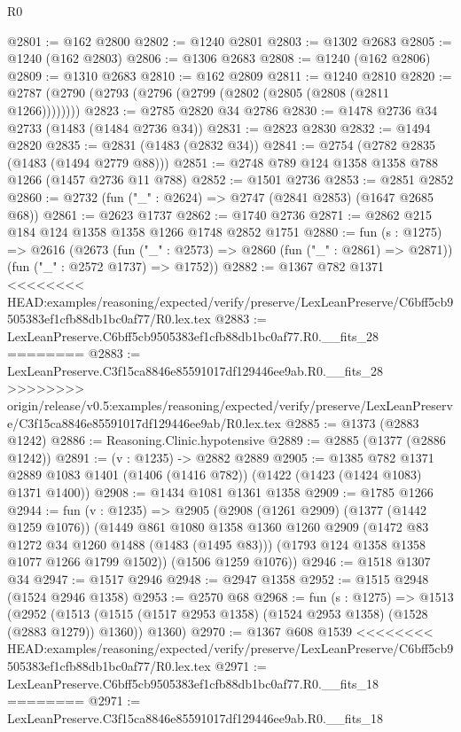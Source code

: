 \begin{lexlean}{R0}
\begin{coremodule}
{{{{{{{{{{{{{{{{{{{{{{{{{{{{{{{{{{{{{{{{{{{{{{{{{{{{{{{{{{{{{{{{{{{{{{{{{{{{{{{{{{{{{{@2801 := @162 @2800
@2802 := @1240 @2801
@2803 := @1302 @2683
@2805 := @1240 (@162 @2803)
@2806 := @1306 @2683
@2808 := @1240 (@162 @2806)
@2809 := @1310 @2683
@2810 := @162 @2809
@2811 := @1240 @2810
@2820 := @2787 (@2790 (@2793 (@2796 (@2799 (@2802 (@2805 (@2808 (@2811 @1266))))))))
@2823 := @2785 @2820 @34 @2786
@2830 := @1478 @2736 @34 @2733 (@1483 (@1484 @2736 @34))
@2831 := @2823 @2830
@2832 := @1494 @2820
@2835 := @2831 (@1483 (@2832 @34))
@2841 := @2754 (@2782 @2835 (@1483 (@1494 @2779 @88)))
@2851 := @2748 @789 @124 @1358 @1358 @788 @1266 (@1457 @2736 @11 @788)
@2852 := @1501 @2736
@2853 := @2851 @2852
@2860 := @2732 (fun ("_" : @2624) => @2747 (@2841 @2853) (@1647 @2685 @68))
@2861 := @2623 @1737
@2862 := @1740 @2736
@2871 := @2862 @215 @184 @124 @1358 @1358 @1266 @1748 @2852 @1751
@2880 := fun (s : @1275) =>
  @2616
    (@2673
      (fun ("_" : @2573) => @2860 (fun ("_" : @2861) => @2871))
      (fun ("_" : @2572 @1737) => @1752))
@2882 := @1367 @782 @1371
<<<<<<<< HEAD:examples/reasoning/expected/verify/preserve/LexLeanPreserve/C6bff5cb9505383ef1cfb88db1bc0af77/R0.lex.tex
@2883 := LexLeanPreserve.C6bff5cb9505383ef1cfb88db1bc0af77.R0.__fits_28
========
@2883 := LexLeanPreserve.C3f15ca8846e85591017df129446ee9ab.R0.__fits_28
>>>>>>>> origin/release/v0.5:examples/reasoning/expected/verify/preserve/LexLeanPreserve/C3f15ca8846e85591017df129446ee9ab/R0.lex.tex
@2885 := @1373 (@2883 @1242)
@2886 := Reasoning.Clinic.hypotensive
@2889 := @2885 (@1377 (@2886 @1242))
@2891 := (v : @1235) -> @2882 @2889
@2905 := @1385
    @782
    @1371
    @2889
    @1083
    @1401
    (@1406 (@1416 @782))
    (@1422 (@1423 (@1424 @1083) @1371 @1400))
@2908 := @1434 @1081 @1361 @1358
@2909 := @1785 @1266
@2944 := fun (v : @1235) =>
  @2905
    (@2908
      (@1261 @2909)
      (@1377 (@1442 @1259 @1076))
      (@1449
        @861
        @1080
        @1358
        @1360
        @1260
        @2909
        (@1472 @83 @1272 @34 @1260 @1488 (@1483 (@1495 @83)))
        (@1793 @124 @1358 @1358 @1077 @1266 @1799 @1502))
      (@1506 @1259 @1076))
@2946 := @1518 @1307 @34
@2947 := @1517 @2946
@2948 := @2947 @1358
@2952 := @1515 @2948 (@1524 @2946 @1358)
@2953 := @2570 @68
@2968 := fun (s : @1275) =>
  @1513
    (@2952
      (@1513 (@1515 (@1517 @2953 @1358) (@1524 @2953 @1358) (@1528 (@2883 @1279)) @1360))
      @1360)
@2970 := @1367 @608 @1539
<<<<<<<< HEAD:examples/reasoning/expected/verify/preserve/LexLeanPreserve/C6bff5cb9505383ef1cfb88db1bc0af77/R0.lex.tex
@2971 := LexLeanPreserve.C6bff5cb9505383ef1cfb88db1bc0af77.R0.__fits_18
========
@2971 := LexLeanPreserve.C3f15ca8846e85591017df129446ee9ab.R0.__fits_18
}}}}}}}}}}}}}}}}}}}}}}}}}}}}}}}}}}}}}}}}}}}}}}}}}}}}}}}}}}}}}}}}}}}}}}}}}}}}}}}}}}}}}}
\end{coremodule}
\end{lexlean}
